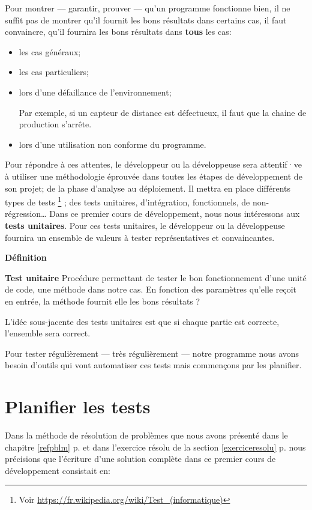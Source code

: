 Pour montrer --- garantir, prouver --- qu'un programme fonctionne bien, il ne suffit
pas de montrer qu'il fournit les bons résultats dans certains cas, il faut
convaincre, qu'il fournira les bons résultats dans \textbf{tous} les cas:

\begin{itemize}
	\item les cas généraux;
	\item les cas particuliers;
	\item lors d'une défaillance de l'environnement;
		
		Par exemple, si un capteur de distance est défectueux, il faut que la 
		chaine de production s'arrête. 
	
	\item lors d'une utilisation non conforme du programme.
\end{itemize}

Pour répondre à ces attentes, le développeur ou la développeuse sera attentif·ve
à utiliser une méthodologie éprouvée dans toutes les étapes de développement de
son projet; de la phase d'analyse au déploiement.  Il mettra en place différents
types de tests
\footnote{Voir \url{https://fr.wikipedia.org/wiki/Test_(informatique)}}
; des tests unitaires, d'intégration, fonctionnels, de non-régression… Dans ce
premier cours de développement, nous nous intéressons aux \textbf{tests
unitaires}.  Pour ces tests unitaires, le développeur ou la développeuse
fournira un ensemble de valeurs à tester représentatives et convaincantes. 

\textbf{Définition}

\textbf{Test unitaire} Procédure permettant de tester le bon fonctionnement d'une unité de code, une méthode  dans notre cas. En fonction des paramètres qu'elle reçoit en entrée, la
méthode fournit elle les bons résultats ? 

L'idée sous-jacente des tests unitaires est que si chaque partie est correcte,
l'ensemble sera correct. 

Pour tester régulièrement --- très régulièrement --- notre programme nous avons besoin
d'outils qui vont automatiser ces tests mais commençons par les planifier. 


\section{Planifier les tests}

Dans la méthode de résolution de problèmes que nous avons présenté dans le chapitre \ref{refpblm} p.\pageref{refpblm} et dans l'exercice résolu de la section \ref{exerciceresolu} p.\pageref{exerciceresolu} nous précisions que l'écriture d'une solution complète dans ce premier cours de développement consistait en: 

